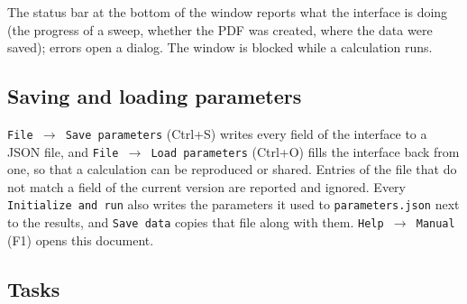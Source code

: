 \documentclass[11pt,a4paper]{article}
\newcommand{\op}[1]{\texttt{#1}}
\begin{document}
The status bar at the bottom of the window reports what the interface is doing
(the progress of a sweep, whether the PDF was created, where the data were
saved); errors open a dialog.  The window is blocked while a calculation runs.

\subsection{Saving and loading parameters}

\op{File $\to$ Save parameters} (Ctrl+S) writes every field of the interface to
a JSON file, and \op{File $\to$ Load parameters} (Ctrl+O) fills the interface
back from one, so that a calculation can be reproduced or shared.  Entries of
the file that do not match a field of the current version are reported and
ignored.  Every \op{Initialize and run} also writes the parameters it used to
\op{parameters.json} next to the results, and \op{Save data} copies that file
along with them.  \op{Help $\to$ Manual} (F1) opens this document.

\subsection{Tasks}
\end{document}
